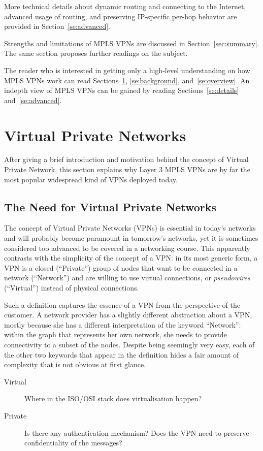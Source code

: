 \documentclass{article}
\begin{document}
More technical details about dynamic routing and connecting to the Internet, 
advanced usage of routing, and preserving IP-specific per-hop behavior are 
provided in Section~\ref{se:advanced}. 


Strengths and limitations of MPLS VPNs are discussed in Section~\ref{sec:summary}. The
same section proposes further readings on the subject.

The reader who is interested in getting only a high-level understanding on how MPLS VPNs work can
read Sections~\ref{se:intro}, \ref{se:background}, and~\ref{se:overview}. An indepth view
of MPLS VPNs can be gained by reading Sections~\ref{se:details} and~\ref{se:advanced}.

\newpage

\tableofcontents

\newpage

\section{Virtual Private Networks}\label{se:intro}

After giving a brief introduction and motivation behind the concept of Virtual 
Private Network, this section explains why Layer 3 MPLS VPNs are by far the most 
popular widespread kind of VPNs deployed today.


\subsection{The Need for Virtual Private Networks}
The concept of Virtual Private Networks (VPNs) is essential in today's 
networks and will probably become paramount in tomorrow's networks, yet it is 
sometimes considered too advanced to be covered in a networking course. This 
apparently contrasts with the simplicity of the concept of a VPN: in its most 
generic form, a VPN is a closed (``Private'') group of nodes
that want to be connected in a network (``Network'') and are willing to use 
virtual connections, or \emph{pseudowires} (``Virtual'') instead of physical 
connections. 

Such a definition captures the essence of a VPN from the perspective of the 
customer. A network provider has a slightly different abstraction about a VPN, 
mostly because she has a different interpretation of the keyword ``Network'': 
within the graph that represents her own network, she needs to provide 
connectivity to a subset of the nodes. Despite being seemingly very easy, each 
of the other two keywords that appear in the definition hides a fair amount of 
complexity that is not obvious at first glance. 
\begin{description}
 \item[Virtual] Where in the ISO/OSI stack does virtualisation happen?
 \item[Private] Is there any authentication mechanism? Does the VPN
need to preserve confidentiality of the messages?
 \end{description}
\end{document}
